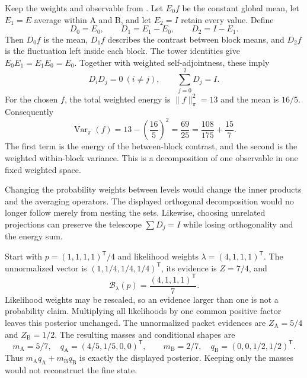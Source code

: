 Keep the weights and observable from . Let $E_0f$ be the constant global mean, let $E_1=E$ average within A and B, and let $E_2=I$ retain every value. Define
\[
D_0=E_0,\qquad D_1=E_1-E_0,\qquad D_2=I-E_1.
\]
Then $D_0f$ is the mean, $D_1f$ describes the contrast between block means, and $D_2f$ is the fluctuation left inside each block.
The tower identities give $E_0E_1=E_1E_0=E_0$. Together with weighted self-adjointness, these imply
\[
D_iD_j=0\ (i\ne j),\qquad \sum_{j=0}^2 D_j=I.
\]
For the chosen $f$, the total weighted energy is $\|f\|_\pi^2=13$ and the mean is $16/5$. Consequently
\[
\operatorname{Var}_\pi(f)
=13-\left(\frac{16}{5}\right)^2
=\frac{69}{25}
=\frac{108}{175}+\frac{15}{7}.
\]
The first term is the energy of the between-block contrast, and the second is the weighted within-block variance. This is a decomposition of one observable in one fixed weighted space.

Changing the probability weights between levels would change the inner products and the averaging operators. The displayed orthogonal decomposition would no longer follow merely from nesting the sets. Likewise, choosing unrelated projections can preserve the telescope $\sum D_j=I$ while losing orthogonality and the energy sum.

Start with $p=(1,1,1,1)^{\mathsf T}/4$ and likelihood weights $\lambda=(4,1,1,1)^{\mathsf T}$. The unnormalized vector is $(1,1/4,1/4,1/4)^{\mathsf T}$, its evidence is $Z=7/4$, and
\[
\mathcal B_\lambda(p)=\frac{(4,1,1,1)^{\mathsf T}}7.
\]
Likelihood weights may be rescaled, so an evidence larger than one is not a probability claim. Multiplying all likelihoods by one common positive factor leaves this posterior unchanged.
The unnormalized packet evidences are $Z_{\mathrm A}=5/4$ and $Z_{\mathrm B}=1/2$. The resulting masses and conditional shapes are
\[
m_{\mathrm A}=5/7,\quad q_{\mathrm A}=(4/5,1/5,0,0)^{\mathsf T},
\qquad m_{\mathrm B}=2/7,\quad q_{\mathrm B}=(0,0,1/2,1/2)^{\mathsf T}.
\]
Thus $m_{\mathrm A}q_{\mathrm A}+m_{\mathrm B}q_{\mathrm B}$ is exactly the displayed posterior. Keeping only the masses would not reconstruct the fine state.

